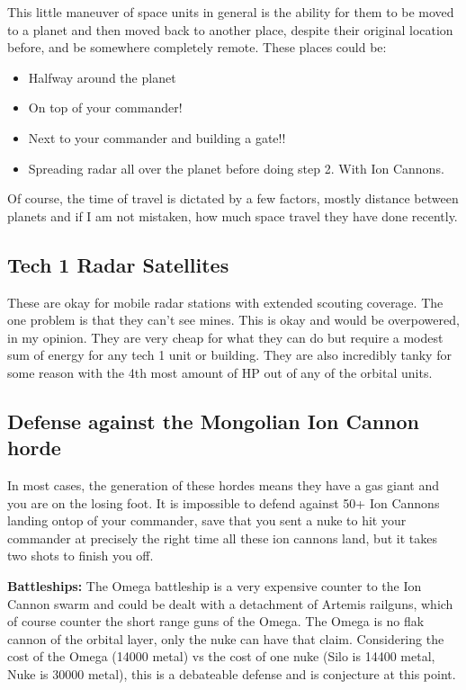 \documentclass[]{article}
\begin{document}
This little maneuver of space units in general is the ability for them to be moved to a planet and then moved back to another place, despite their original location before, and be somewhere completely remote.  These places could be:

\begin{itemize}
	\item Halfway around the planet
	\item On top of your commander!
	\item Next to your commander and building a gate!!
	\item Spreading radar all over the planet before doing step 2.  With Ion Cannons.  
\end{itemize}

Of course, the time of travel is dictated by a few factors, mostly distance between planets and if I am not mistaken, how much space travel they have done recently.  

\subsection{Tech 1 Radar Satellites}

These are okay for mobile radar stations with extended scouting coverage.  The one problem is that they can't see mines.  This is okay and would be overpowered, in my opinion.  They are very cheap for what they can do but require a modest sum of energy for any tech 1 unit or building.  They are also incredibly tanky for some reason with the 4th most amount of HP out of any of the orbital units.  

\subsection{Defense against the Mongolian Ion Cannon horde}

In most cases, the generation of these hordes means they have a gas giant and you are on the losing foot.  It is impossible to defend against 50+ Ion Cannons landing ontop of your commander, save that you sent a nuke to hit your commander at precisely the right time all these ion cannons land, but it takes two shots to finish you off.  

\textbf{Battleships:} The Omega battleship is a very expensive counter to the Ion Cannon swarm and could be dealt with a detachment of Artemis railguns, which of course counter the short range guns of the Omega.  The Omega is no flak cannon of the orbital layer, only the nuke can have that claim.  Considering the cost of the Omega (14000 metal) vs the cost of one nuke (Silo is 14400 metal, Nuke is 30000 metal), this is a debateable defense and is conjecture at this point.  
\end{document}
